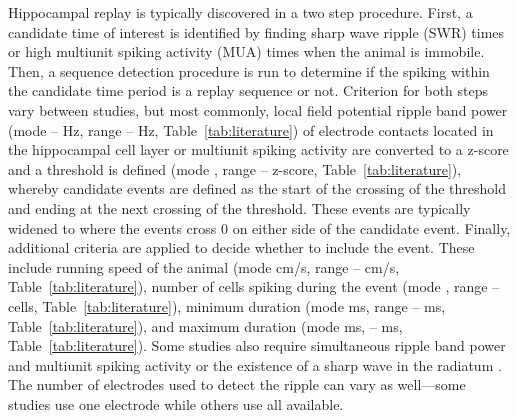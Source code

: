 \documentclass[11pt]{article}
\begin{document}
Hippocampal replay is typically discovered in a two step procedure. First, a candidate time of interest is identified by finding sharp wave ripple (SWR) times or high multiunit spiking activity (MUA) times when the animal is immobile. Then, a sequence detection procedure is run to determine if the spiking within the candidate time period is a replay sequence or not. Criterion for both steps vary between studies, but most commonly, local field potential ripple band power (mode \SurveyBandLowMode--\SurveyBandHighMode{} Hz, range \SurveyBandLowMin--\SurveyBandHighMax{} Hz, Table~\ref{tab:literature}) of electrode contacts located in the hippocampal cell layer or multiunit spiking activity are converted to a z-score and a threshold is defined (mode \SurveyThresholdMode, range \SurveyThresholdMin--\SurveyThresholdMax{} z-score, Table~\ref{tab:literature}), whereby candidate events are defined as the start of the crossing of the threshold and ending at the next crossing of the threshold. These events are typically widened to where the events cross 0 on either side of the candidate event. Finally, additional criteria are applied to decide whether to include the event. These include running speed of the animal (mode \SurveySpeedMode{} cm/s, range \SurveySpeedMin--\SurveySpeedMax{} cm/s, Table~\ref{tab:literature}), number of cells spiking during the event (mode \SurveyCellsMode, range \SurveyCellsMin--\SurveyCellsMax{} cells, Table~\ref{tab:literature}), minimum duration (mode \SurveyShortestMode{} ms, range \SurveyShortestMin--\SurveyShortestMax{} ms, Table~\ref{tab:literature}), and maximum duration (mode \SurveyLongestMode{} ms, \SurveyLongestMin--\SurveyLongestMax{} ms, Table~\ref{tab:literature}). Some studies also require simultaneous ripple band power and multiunit spiking activity \cite{GrosmarkDiversityneuralfiring2016,YangSelectionexperiencememory2024,IgataPrioritizedexperiencereplays2021} or the existence of a sharp wave in the radiatum \cite{HarveyHippocampocorticalcircuitsselective2023,LiuAssociativepredictivehippocampal2023}. The number of electrodes used to detect the ripple can vary as well—some studies use one electrode while others use all available.
\end{document}
